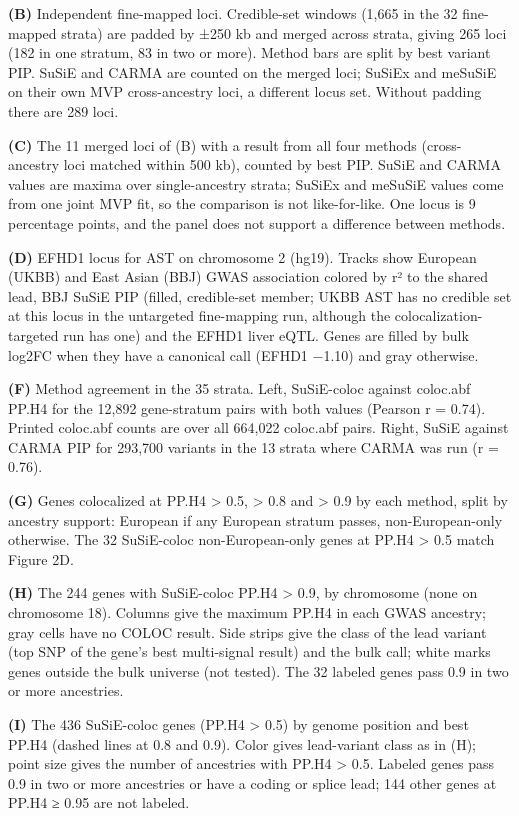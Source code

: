 \textbf{(B)} Independent fine-mapped loci. Credible-set windows (1,665 in the 32 fine-mapped strata) are padded by ±250 kb and merged across strata, giving 265 loci (182 in one stratum, 83 in two or more). Method bars are split by best variant PIP. SuSiE and CARMA are counted on the merged loci; SuSiEx and meSuSiE on their own MVP cross-ancestry loci, a different locus set. Without padding there are 289 loci.

\textbf{(C)} The 11 merged loci of (B) with a result from all four methods (cross-ancestry loci matched within 500 kb), counted by best PIP. SuSiE and CARMA values are maxima over single-ancestry strata; SuSiEx and meSuSiE values come from one joint MVP fit, so the comparison is not like-for-like. One locus is 9 percentage points, and the panel does not support a difference between methods.

\textbf{(D)} EFHD1 locus for AST on chromosome 2 (hg19). Tracks show European (UKBB) and East Asian (BBJ) GWAS association colored by r² to the shared lead, BBJ SuSiE PIP (filled, credible-set member; UKBB AST has no credible set at this locus in the untargeted fine-mapping run, although the colocalization-targeted run has one) and the EFHD1 liver eQTL. Genes are filled by bulk log2FC when they have a canonical call (EFHD1 −1.10) and gray otherwise.

\textbf{(F)} Method agreement in the 35 strata. Left, SuSiE-coloc against coloc.abf PP.H4 for the 12,892 gene-stratum pairs with both values (Pearson r = 0.74). Printed coloc.abf counts are over all 664,022 coloc.abf pairs. Right, SuSiE against CARMA PIP for 293,700 variants in the 13 strata where CARMA was run (r = 0.76).

\textbf{(G)} Genes colocalized at PP.H4 \textgreater{} 0.5, \textgreater{} 0.8 and \textgreater{} 0.9 by each method, split by ancestry support: European if any European stratum passes, non-European-only otherwise. The 32 SuSiE-coloc non-European-only genes at PP.H4 \textgreater{} 0.5 match Figure 2D.

\textbf{(H)} The 244 genes with SuSiE-coloc PP.H4 \textgreater{} 0.9, by chromosome (none on chromosome 18). Columns give the maximum PP.H4 in each GWAS ancestry; gray cells have no COLOC result. Side strips give the class of the lead variant (top SNP of the gene's best multi-signal result) and the bulk call; white marks genes outside the bulk universe (not tested). The 32 labeled genes pass 0.9 in two or more ancestries.

\textbf{(I)} The 436 SuSiE-coloc genes (PP.H4 \textgreater{} 0.5) by genome position and best PP.H4 (dashed lines at 0.8 and 0.9). Color gives lead-variant class as in (H); point size gives the number of ancestries with PP.H4 \textgreater{} 0.5. Labeled genes pass 0.9 in two or more ancestries or have a coding or splice lead; 144 other genes at PP.H4 ≥ 0.95 are not labeled.

